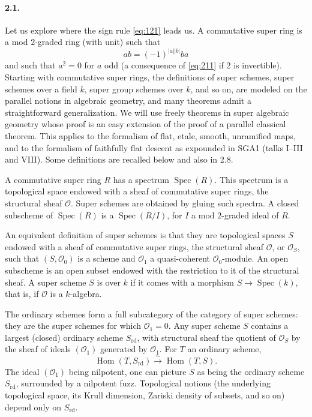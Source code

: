 \documentclass[11pt]{article}
\newcommand{\Spec}{\operatorname{Spec}}
\newcommand{\Hom}{\operatorname{Hom}}
\newcommand{\rd}{\mathrm{rd}}
\newcommand{\calO}{\mathcal O}
\begin{document}
\paragraph{2.1.}
Let us explore where the sign rule \eqref{eq:121} leads us. A commutative super ring is a mod $2$-graded ring (with unit) such that
\begin{equation}
\label{eq:211}
ab=(-1)^{|a||b|}ba
\end{equation}
and such that $a^2=0$ for $a$ odd (a consequence of \eqref{eq:211} if $2$ is invertible). Starting with commutative super rings, the definitions of super schemes, super schemes over a field $k$, super group schemes over $k$, and so on, are modeled on the parallel notions in algebraic geometry, and many theorems admit a straightforward generalization. We will use freely theorems in super algebraic geometry whose proof is an easy extension of the proof of a parallel classical theorem. This applies to the formalism of flat, etale, smooth, unramified maps, and to the formalism of faithfully flat descent as expounded in SGA1 (talks I--III and VIII). Some definitions are recalled below and also in 2.8.

A commutative super ring $R$ has a spectrum $\Spec(R)$. This spectrum is a topological space endowed with a sheaf of commutative super rings, the structural sheaf $\calO$. Super schemes are obtained by gluing such spectra. A closed subscheme of $\Spec(R)$ is a $\Spec(R/I)$, for $I$ a mod $2$-graded ideal of $R$.

An equivalent definition of super schemes is that they are topological spaces $S$ endowed with a sheaf of commutative super rings, the structural sheaf $\calO$, or $\calO_S$, such that $(S,\calO_0)$ is a scheme and $\calO_1$ a quasi-coherent $\calO_0$-module. An open subscheme is an open subset endowed with the restriction to it of the structural sheaf. A super scheme $S$ is over $k$ if it comes with a morphism $S\to\Spec(k)$, that is, if $\calO$ is a $k$-algebra.

The ordinary schemes form a full subcategory of the category of super schemes: they are the super schemes for which $\calO_1=0$. Any super scheme $S$ contains a largest (closed) ordinary scheme $S_{\rd}$, with structural sheaf the quotient of $\calO_S$ by the sheaf of ideals $(\calO_1)$ generated by $\calO_1$. For $T$ an ordinary scheme,
\[
\Hom(T,S_{\rd})\xrightarrow{\sim}\Hom(T,S).
\]
The ideal $(\calO_1)$ being nilpotent, one can picture $S$ as being the ordinary scheme $S_{\rd}$, surrounded by a nilpotent fuzz. Topological notions (the underlying topological space, its Krull dimension, Zariski density of subsets, and so on) depend only on $S_{\rd}$.
\end{document}
